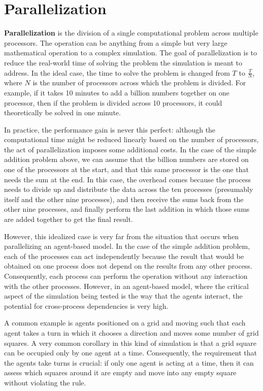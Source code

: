 
\chapter{Parallelization} \label{chap:Parallelization}
\textbf{Parallelization} is the division of a single computational problem across multiple processors. The operation can be anything from a simple but very large mathematical operation to a complex simulation. The goal of parallelization is to reduce the real-world time of solving the problem the simulation is meant to address. In the ideal case, the time to solve the problem is changed from $T$ to $\frac{T}{N}$, where $N$ is the number of processors across which the problem is divided. For example, if it takes 10 minutes to add a billion numbers together on one processor, then if the problem is divided across 10 processors, it could theoretically be solved in one minute.

In practice, the performance gain is never this perfect: although the computational time might be reduced linearly based on the number of processors, the act of parallelization imposes some additional costs. In the case of the simple addition problem above, we can assume that the billion numbers are stored on one of the processors at the start, and that this same processor is the one that needs the sum at the end. In this case, the overhead comes because the process needs to divide up and distribute the data across the ten processes (presumably itself and the other nine processes), and then receive the sums back from the other nine processes, and finally perform the last addition in which those sums are added together to get the final result.

However, this idealized case is very far from the situation that occurs when parallelizing an agent-based model. In the case of the simple addition problem, each of the processes can act independently because the result that would be obtained on one process does not depend on the results from any other process. Consequently, each process can perform the operation without any interaction with the other processes. However, in an agent-based model, where the critical aspect of the simulation being tested is the way that the agents interact, the potential for cross-process dependencies is very high.

A common example is agents positioned on a grid and moving such that each agent takes a turn in which it chooses a direction and moves some number of grid squares. A very common corollary in this kind of simulation is that a grid square can be occupied only by one agent at a time. Consequently, the requirement that the agents take turns is crucial: if only one agent is acting at a time, then it can assess which squares around it are empty and move into any empty square without violating the rule.

